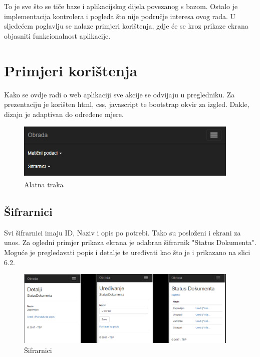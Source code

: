 \documentclass[a4paper,12pt]{foi}
\begin{document}
To je sve što se tiče baze i aplikacijskog dijela povezanog s bazom. Ostalo je implementacija kontrolera i pogleda što nije područje interesa ovog rada. U sljedećem poglavlju se nalaze primjeri korištenja, gdje će se kroz prikaze ekrana objasniti funkcionalnost aplikacije.

\chapter{Primjeri korištenja}

Kako se ovdje radi o web aplikaciji sve akcije se odvijaju u pregledniku. Za prezentaciju je korišten html, css, javascript te bootstrap okvir za izgled. Dakle, dizajn je adaptivan do određene mjere. 

\begin{figure}[h]
\centering 
\includegraphics[width=0.95\textwidth]{alatna_traka.png}
\caption{Alatna traka}
\label{slika-3}
\end{figure}

\section{Šifrarnici}

Svi šifrarnici imaju ID, Naziv i opis po potrebi. Tako su posloženi i ekrani za unos. Za ogledni primjer prikaza ekrana je odabran šifrarnik "Status Dokumenta". Moguće je pregledavati popis i detalje te uređivati kao što je i prikazano na slici 6.2.

\begin{figure}[h]
\centering 
\includegraphics[width=0.95\textwidth]{sifrarnici.png}
\caption{Šifrarnici}
\label{slika-4}
\end{figure}
\end{document}
